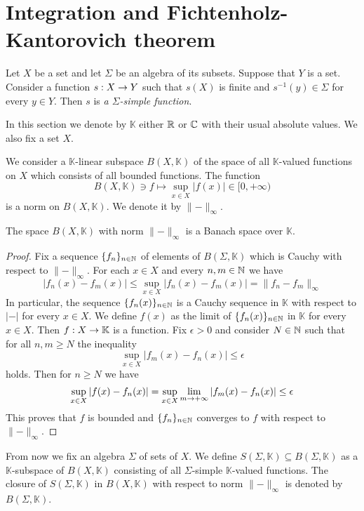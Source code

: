 \section{Integration and Fichtenholz-Kantorovich theorem}

\begin{definition}
    Let $X$ be a set and let $\Sigma$ be an algebra of its subsets. Suppose that $Y$ is a set. Consider a function $s:X\rightarrow Y$ such that $s(X)$ is finite and $s^{-1}(y) \in \Sigma$ for every $y \in Y$. Then $s$ is \textit{a $\Sigma$-simple function}.
\end{definition}
\noindent
In this section we denote by $\mathbb{K}$ either ${\mathbb R}$ or ${\mathbb C}$ with their usual absolute values. We also fix a set $X$. 

We consider a $\mathbb{K}$-linear subspace $B(X,\mathbb{K})$ of the space of all $\mathbb{K}$-valued functions on $X$ which consists of all bounded functions. The function
$$B(X,\mathbb{K}) \ni f \mapsto \sup_{x\in X}|f(x)|\in [0,+\infty)$$
is a norm on $B(X, \mathbb{K})$. We denote it by $\lVert-\rVert_{\infty}$. 

\begin{theorem}\label{theorem:Banach_space_of_bounded_functions}
    The space $B(X,\mathbb{K})$ with norm $\lVert-\rVert_{\infty}$ is a Banach space over $\mathbb{K}$.
\end{theorem}
\begin{proof}
    Fix a sequence $\{f_n\}_{n\in {\mathbb N}}$ of elements of $B(\Sigma,\mathbb{K})$ which is Cauchy with respect to $\lVert-\rVert_{\infty}$. For each $x \in X$ and every $n,m\in {\mathbb N}$ we have
    $$|f_n(x) - f_m(x)|\leq \sup_{x\in X}|f_n(x) - f_m(x)| = \lVert f_n - f_m \rVert_{\infty}$$
    In particular, the sequence $\{f_n(x)\}_{n\in {\mathbb N}}$ is a Cauchy sequence in $\mathbb{K}$ with respect to $|-|$ for every $x \in X$. We define $f(x)$ as the limit of $\{f_n(x)\}_{n\in {\mathbb N}}$ in $\mathbb{K}$ for every $x \in X$. Then $f:X\rightarrow \mathbb{K}$ is a function. Fix $\epsilon > 0$ and consider $N \in {\mathbb N}$ such that for all $n,m\geq N$ the inequality
    $$\sup_{x\in X}|f_m(x) - f_n(x)|\leq \epsilon$$
    holds. Then for $n \geq N$ we have
    $$\sup_{x\in X}|f(x) - f_n(x)| = \sup_{x\in X}\lim_{m\rightarrow +\infty}|f_m(x) - f_n(x)| \leq \epsilon$$
    This proves that $f$ is bounded and $\{f_n\}_{n\in {\mathbb N}}$ converges to $f$ with respect to $\lVert -\rVert_{\infty}$. 
\end{proof}
\noindent
From now we fix an algebra $\Sigma$ of sets of $X$. We define $S(\Sigma,\mathbb{K})\subseteq B(\Sigma,\mathbb{K})$ as a $\mathbb{K}$-subspace of $B(X,\mathbb{K})$ consisting of all $\Sigma$-simple $\mathbb{K}$-valued functions. The closure of $S(\Sigma,\mathbb{K})$ in $B(X,\mathbb{K})$ with respect to norm $\lVert - \rVert_{\infty}$ is denoted by $B(\Sigma,\mathbb{K})$.



